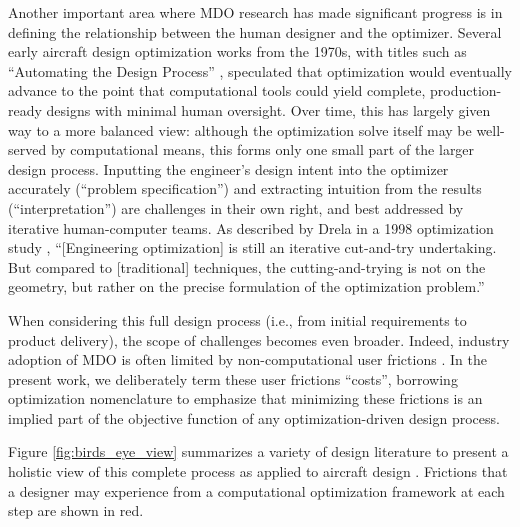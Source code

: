 \documentclass[12pt,vi,oneside]{report}
\begin{document}
    Another important area where MDO research has made significant progress is in defining the relationship between the human designer and the optimizer. Several early aircraft design optimization works from the 1970s, with titles such as ``Automating the Design Process'' \cite{heldenfels_automating_1973, heldenfels_automation_1974, vanderplaats_automated_1976}, speculated that optimization would eventually advance to the point that computational tools could yield complete, production-ready designs with minimal human oversight. Over time, this has largely given way to a more balanced view: although the optimization solve itself may be well-served by computational means, this forms only one small part of the larger design process. Inputting the engineer's design intent into the optimizer accurately (``problem specification'') and extracting intuition from the results (``interpretation'') are challenges in their own right, and best addressed by iterative human-computer teams. As described by Drela in a 1998 optimization study \cite{drela_pros_1998}, ``[Engineering optimization] is still an iterative cut-and-try undertaking. But compared to [traditional] techniques, the cutting-and-trying is not on the geometry, but rather on the precise formulation of the optimization problem.''

    When considering this full design process (i.e., from initial requirements to product delivery), the scope of challenges becomes even broader. Indeed, industry adoption of MDO is often limited by non-computational user frictions \cite{salas_framework_1998, gpkit, martins_engineering_2021}. In the present work, we deliberately term these user frictions ``costs'', borrowing optimization nomenclature to emphasize that minimizing these frictions is an implied part of the objective function of any optimization-driven design process.

    Figure \ref{fig:birds_eye_view} summarizes a variety of design literature to present a holistic view of this complete process as applied to aircraft design \cite{torenbeek_advanced_2013, martins_engineering_2021, yang_observations_2009, torenbeek_synthesis_1976, roskam_airplane_1989, nicolai_fundamentals_2010, salas_framework_1998}. Frictions that a designer may experience from a computational optimization framework at each step are shown in \textcolor[HTML]{BB5045}{red}.
\end{document}
